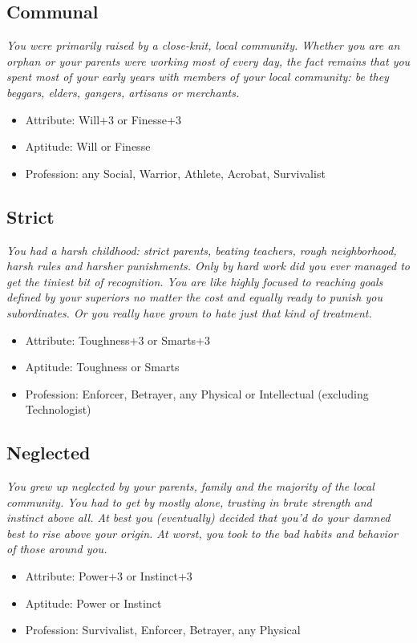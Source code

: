 	\subsection{Communal}
	\textit{You were primarily raised by a close-knit, local community. Whether you are an orphan or your parents were working most of every day, the fact remains that you spent most of your early years with members of your local community: be they beggars, elders, gangers, artisans or merchants.}
	\begin{itemize}
		\item Attribute: Will+3 or Finesse+3
		\item Aptitude: Will or Finesse
		\item Profession: any Social, Warrior, Athlete, Acrobat, Survivalist
	\end{itemize}

	\subsection{Strict}
	\textit{You had a harsh childhood: strict parents, beating teachers, rough neighborhood, harsh rules and harsher punishments. Only by hard work did you ever managed to get the tiniest bit of recognition. You are like highly focused to reaching goals defined by your superiors no matter the cost and equally ready to punish you subordinates. Or you really have grown to hate just that kind of treatment.}
	\begin{itemize}
		\item Attribute: Toughness+3 or Smarts+3
		\item Aptitude: Toughness or Smarts
		\item Profession: Enforcer, Betrayer, any Physical or Intellectual (excluding Technologist)
	\end{itemize}

	\subsection{Neglected}
	\textit{You grew up neglected by your parents, family and the majority of the local community. You had to get by mostly alone, trusting in brute strength and instinct above all. At best you (eventually) decided that you'd do your damned best to rise above your origin. At worst, you took to the bad habits and behavior of those around you.}
	\begin{itemize}
		\item Attribute: Power+3 or Instinct+3
		\item Aptitude: Power or Instinct
		\item Profession: Survivalist, Enforcer, Betrayer, any Physical
	\end{itemize}

